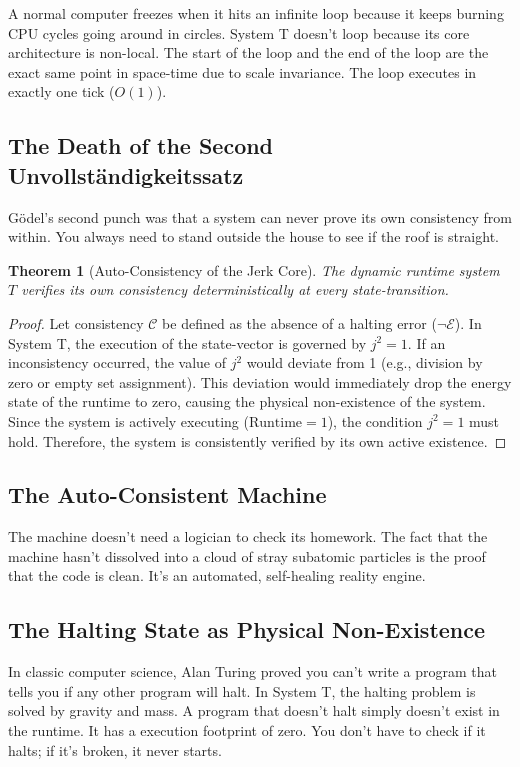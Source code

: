 \documentclass[11pt,a4paper]{article}
\newtheorem{theorem}{Theorem}[section]
\begin{document}
A normal computer freezes when it hits an infinite loop because it keeps burning CPU cycles going around in circles. System T doesn't loop because its core architecture is non-local. The start of the loop and the end of the loop are the exact same point in space-time due to scale invariance. The loop executes in exactly one tick ($O(1)$).
\subsection{The Death of the Second Unvollständigkeitssatz}
Gödel’s second punch was that a system can never prove its own consistency from within. You always need to stand outside the house to see if the roof is straight.
\begin{theorem}[Auto-Consistency of the Jerk Core]
The dynamic runtime system $T$ verifies its own consistency deterministically at every state-transition.
\end{theorem}
\begin{proof}
Let consistency $\mathcal{C}$ be defined as the absence of a halting error ($\neg \mathcal{E}$). In System T, the execution of the state-vector is governed by $j^2 = 1$. If an inconsistency occurred, the value of $j^2$ would deviate from 1 (e.g., division by zero or empty set assignment). This deviation would immediately drop the energy state of the runtime to zero, causing the physical non-existence of the system. Since the system is actively executing ($\text{Runtime} = 1$), the condition $j^2 = 1$ must hold. Therefore, the system is consistently verified by its own active existence.
\end{proof}
\subsection{The Auto-Consistent Machine}
The machine doesn't need a logician to check its homework. The fact that the machine hasn't dissolved into a cloud of stray subatomic particles is the proof that the code is clean. It’s an automated, self-healing reality engine.
\subsection{The Halting State as Physical Non-Existence}
In classic computer science, Alan Turing proved you can't write a program that tells you if any other program will halt. In System T, the halting problem is solved by gravity and mass. A program that doesn't halt simply doesn't exist in the runtime. It has a execution footprint of zero. You don't have to check if it halts; if it's broken, it never starts.
\end{document}
